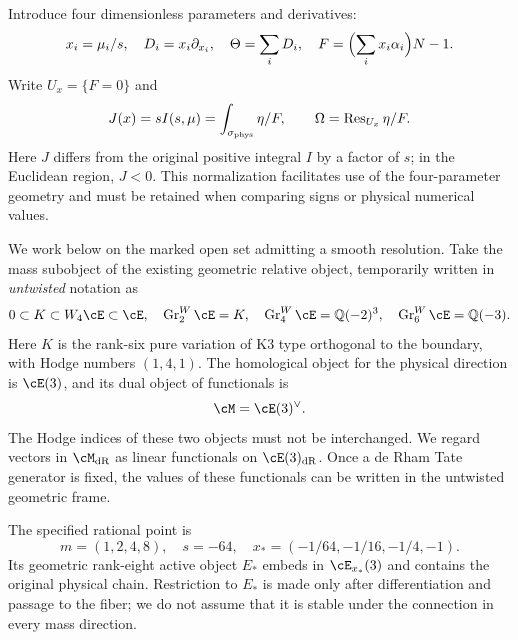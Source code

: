\documentclass[11pt,a4paper,oneside]{article}
\theoremstyle{plain}
\theoremstyle{definition}
\theoremstyle{remark}
\newcommand{\Q}{\mathbb Q}
\newcommand{\Gr}{\operatorname{Gr}}
\newcommand{\Res}{\operatorname{Res}}
\newcommand{\dR}{\mathrm{dR}}
\numberwithin{equation}{section}
\begin{document}
Introduce four dimensionless parameters and derivatives:
\begin{equation}\label{deriv:eq:dimensionless}
 x_i=\mu_i/s,\quad D_i=x_i\partial_{x_i},\quad
 \Theta=\sum_iD_i,\quad
 F=\Bigl(\sum_i x_i\alpha_i\Bigr)N-1.
\end{equation}
Write $U_x=\{F=0\}$ and
\begin{equation}\label{deriv:eq:J}
 J(x)=sI(s,\mu)=\int_{\sigma_{\rm phys}}\eta/F,\qquad
 \Omega=\Res_{U_x}\eta/F.
\end{equation}
Here $J$ differs from the original positive integral $I$ by a factor of $s$; in the Euclidean region, $J<0$.
This normalization facilitates use of the four-parameter geometry and must be retained when comparing signs or physical numerical values.

We work below on the marked open set admitting a smooth resolution.
Take the mass subobject of the existing geometric relative object, temporarily written in \emph{untwisted} notation as
\begin{equation}\label{deriv:eq:mass}
 0\subset K\subset W_4\cE\subset\cE,
 \quad \Gr^W_2\cE=K,\quad
 \Gr^W_4\cE=\Q(-2)^3,\quad
 \Gr^W_6\cE=\Q(-3).
\end{equation}
Here $K$ is the rank-six pure variation of K3 type orthogonal to the boundary, with Hodge numbers $(1,4,1)$.
The homological object for the physical direction is $\cE(3)$, and its dual object of functionals is
\begin{equation}\label{deriv:eq:M}
 \cM=\cE(3)^\vee.
\end{equation}
The Hodge indices of these two objects must not be interchanged.
We regard vectors in $\cM_{\dR}$ as linear functionals on $\cE(3)_{\dR}$.
Once a de Rham Tate generator is fixed, the values of these functionals can be written in the untwisted geometric frame.

The specified rational point is
\begin{equation}\label{deriv:eq:point}
 m=(1,2,4,8),\quad s=-64,\quad
 x_* =(-1/64,-1/16,-1/4,-1).
\end{equation}
Its geometric rank-eight active object $E_*$ embeds in $\cE_{x_*}(3)$ and contains the original physical chain.
Restriction to $E_*$ is made only after differentiation and passage to the fiber; we do not assume that it is stable under the connection in every mass direction.
\end{document}
